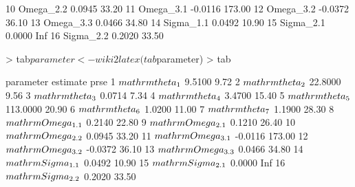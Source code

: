 \begin{Schunk}
\begin{Soutput}
10 Omega_2.2    0.0945  33.20
11 Omega_3.1   -0.0116 173.00
12 Omega_3.2   -0.0372  36.10
13 Omega_3.3    0.0466  34.80
14 Sigma_1.1    0.0492  10.90
15 Sigma_2.1    0.0000    Inf
16 Sigma_2.2    0.2020  33.50
\end{Soutput}
\begin{Sinput}
> tab$parameter <- wiki2latex(tab$parameter)
> tab
\end{Sinput}
\begin{Soutput}
                   parameter estimate   prse
1    $\\mathrm{\\theta_{1}}$   9.5100   9.72
2    $\\mathrm{\\theta_{2}}$  22.8000   9.56
3    $\\mathrm{\\theta_{3}}$   0.0714   7.34
4    $\\mathrm{\\theta_{4}}$   3.4700  15.40
5    $\\mathrm{\\theta_{5}}$ 113.0000  20.90
6    $\\mathrm{\\theta_{6}}$   1.0200  11.00
7    $\\mathrm{\\theta_{7}}$   1.1900  28.30
8  $\\mathrm{\\Omega_{1.1}}$   0.2140  22.80
9  $\\mathrm{\\Omega_{2.1}}$   0.1210  26.40
10 $\\mathrm{\\Omega_{2.2}}$   0.0945  33.20
11 $\\mathrm{\\Omega_{3.1}}$  -0.0116 173.00
12 $\\mathrm{\\Omega_{3.2}}$  -0.0372  36.10
13 $\\mathrm{\\Omega_{3.3}}$   0.0466  34.80
14 $\\mathrm{\\Sigma_{1.1}}$   0.0492  10.90
15 $\\mathrm{\\Sigma_{2.1}}$   0.0000    Inf
16 $\\mathrm{\\Sigma_{2.2}}$   0.2020  33.50
\end{Soutput}
\end{Schunk}
